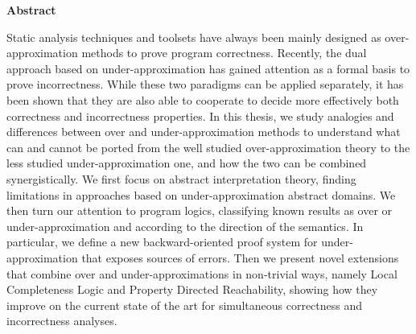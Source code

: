 \thispagestyle{plain}
\begin{center}
	\Large
	\textbf{Abstract}
\end{center}
Static analysis techniques and toolsets have always been mainly designed as over\hyp{}approximation methods to prove program correctness. Recently, the dual approach based on under-approximation has gained attention as a formal basis to prove incorrectness. While these two paradigms can be applied separately, it has been shown that they are also able to cooperate to decide more effectively both correctness and incorrectness properties.
In this thesis, we study analogies and differences between over and under-approximation methods to understand what can and cannot be ported from the well studied over-approximation theory to the less studied under-approximation one, and how the two can be combined synergistically.
We first focus on abstract interpretation theory, finding limitations in approaches based on under-approximation abstract domains. We then turn our attention to program logics, classifying known results as over or under-approximation and according to the direction of the semantics. In particular, we define a new backward-oriented proof system for under-approximation that exposes sources of errors. Then we present novel extensions that combine over and under-approximations in non-trivial ways, namely Local Completeness Logic and Property Directed Reachability, showing how they improve on the current state of the art for simultaneous correctness and incorrectness analyses.
